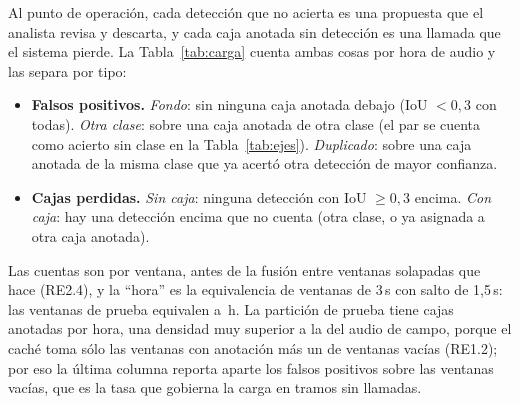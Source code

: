 \documentclass[12pt,a4paper]{article}
\begin{document}
Al punto de operación, cada detección que no acierta es una propuesta que el analista revisa y
descarta, y cada caja anotada sin detección es una llamada que el sistema pierde. La
Tabla~\ref{tab:carga} cuenta ambas cosas por hora de audio y las separa por tipo:

\begin{itemize}
    \item \textbf{Falsos positivos.} \emph{Fondo}: sin ninguna caja anotada debajo
          (IoU $< 0{,}3$ con todas). \emph{Otra clase}: sobre una caja anotada de otra clase
          (el par se cuenta como acierto sin clase en la Tabla~\ref{tab:ejes}).
          \emph{Duplicado}: sobre una caja anotada de la misma clase que ya acertó otra
          detección de mayor confianza.
    \item \textbf{Cajas perdidas.} \emph{Sin caja}: ninguna detección con IoU $\geq 0{,}3$
          encima. \emph{Con caja}: hay una detección encima que no cuenta (otra clase, o ya
          asignada a otra caja anotada).
\end{itemize}

Las cuentas son por ventana, antes de la fusión entre ventanas solapadas que hace
 (RE2.4), y la ``hora'' es la equivalencia de \windowsPerHour{} ventanas
de 3\,s con salto de 1,5\,s: las \nTestWindows{} ventanas de prueba equivalen a
\testHours{}\,h. La partición de prueba tiene \boxesPerHour{} cajas anotadas por hora, una
densidad muy superior a la del audio de campo, porque el caché toma sólo las ventanas con
anotación más un \pctEmptyTest{} de ventanas vacías (RE1.2); por eso la última columna
reporta aparte los falsos positivos sobre las ventanas vacías, que es la tasa que gobierna la
carga en tramos sin llamadas.
\end{document}
